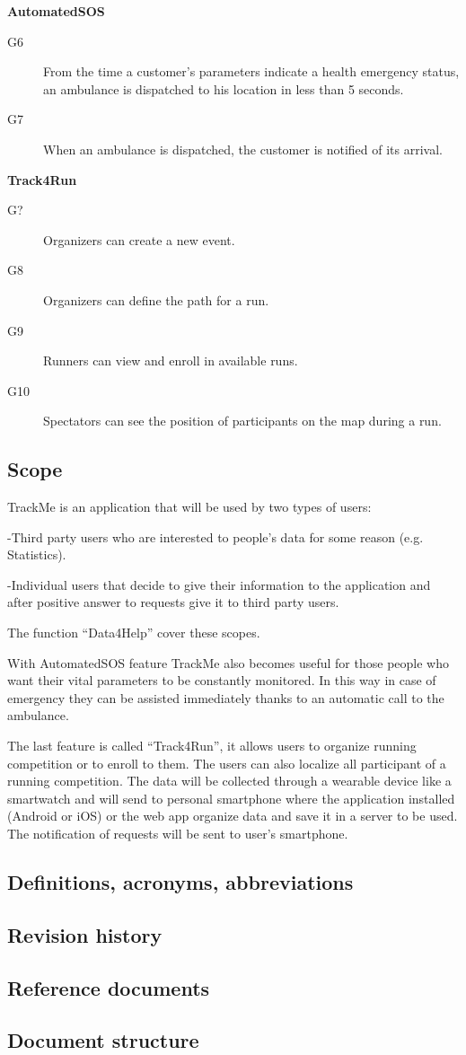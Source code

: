 \documentclass[../main.tex]{subfiles}
\begin{document}
\vspace{2mm}
{\bf AutomatedSOS}
\begin{description}
	\item [G6]  From the time a customer's parameters indicate a health emergency status, an ambulance is dispatched to his location in less than 5 seconds.
	\item [G7]  When an ambulance is dispatched, the customer is notified of its arrival.
\end{description}

\vspace{2mm}
{\bf Track4Run}
\begin{description}
	\item [G?]  Organizers can create a new event.
	\item [G8]  Organizers can define the path for a run.
	\item [G9]  Runners can view and enroll in available runs.
	\item [G10] Spectators can see the position of participants on the map during a run.
\end{description}

\vspace{8mm}
\subsection{Scope}

TrackMe is an application that will be used by two types of users:

-Third party users who are interested to people’s data for some reason (e.g. Statistics).

-Individual users that decide to give their information to the application and after positive answer to requests give it to third party users.

The function “Data4Help” cover these scopes.

With AutomatedSOS feature TrackMe also becomes useful for those people who want their vital parameters to be constantly monitored. In this way in case of emergency they can be assisted immediately thanks to an automatic call to the ambulance.

The last feature is called “Track4Run”, it allows users to organize running competition or to enroll to them. The users can also localize all participant of a running competition.
The data will be collected through a wearable device like a smartwatch and will send to personal smartphone where the application installed (Android or iOS) or the web app organize data and save it in a server to be used. The notification of requests will be sent to user’s smartphone.

\subsection{Definitions, acronyms, abbreviations}
\subsection{Revision history}
\subsection{Reference documents}
\subsection{Document structure}
\end{document}
